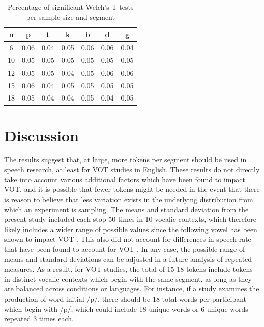 \documentclass[
  a4paper,
  11pt,
  twocolumn]{article}
\begin{document}
\begin{table}[!ht]
  \caption{Percentage of significant Welch's T-tests per sample size and segment}
  \label{tab:fpos}
  \begin{center}
  \begin{tabular}{|c|c|c|c|c|c|c|}
  \hline
  \rowcolor[gray]{.75}
  n & p & t & k & b & d & g  \\
  \hline
  6 & 0.06 & 0.04 & 0.05 & 0.06 & 0.06 & 0.04 \\ 
  10 & 0.05 & 0.05 & 0.05 & 0.05 & 0.05 & 0.05 \\ 
  12 & 0.05 & 0.05 & 0.04 & 0.05 & 0.06 & 0.06 \\ 
  15 & 0.06 & 0.04 & 0.05 & 0.05 & 0.05 & 0.05 \\ 
  18 & 0.05 & 0.04 & 0.04 & 0.05 & 0.04 & 0.05 \\
  \hline
  \end{tabular}
  \end{center}
\end{table}

\section{Discussion}

The results suggest that, at large, more tokens per segment should be
used in speech research, at least for VOT studies in English. These
results do not directly take into account various additional factors
which have been found to impact VOT, and it is possible that fewer
tokens might be needed in the event that there is reason to believe that
less variation exists in the underlying distribution from which an
experiment is sampling. The means and standard deviation from the
present study \cite{chodroff2017structure} included each stop 50 times
in 10 vocalic contexts, which therefore likely includes a wider range of
possible values since the following vowel has been shown to impact VOT
\cite{nearey1994effects}. This also did not account for differences in
speech rate that have been found to account for VOT
\cite{stolten2015effects}. In any case, the possible range of means and
standard deviations can be adjusted in a future analysis of repeated
measures. As a result, for VOT studies, the total of 15-18 tokens
include tokens in distinct vocalic contexts which begin with the same
segment, as long as they are balanced across conditions or languages.
For instance, if a study examines the production of word-initial /p/,
there should be 18 total words per participant which begin with /p/,
which could include 18 unique words or 6 unique words repeated 3 times
each.
\end{document}

